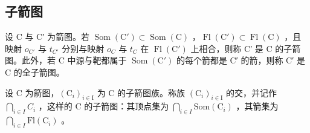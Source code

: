\subsection{子箭图}

设 C 与 C′ 为箭图。若 \(\operatorname{Som}(\mathrm{C}') \subset \operatorname{Som}(\mathrm{C})\) ，\(\operatorname{Fl}(\mathrm{C}') \subset \operatorname{Fl}(\mathrm{C})\) ，且映射 \(o_{C'}\) 与 \(t_{C'}\) 分别与映射 \(o_{C}\) 与 \(t_{C}\) 在 \(\operatorname{Fl}(\mathrm{C}')\) 上相合，则称 C′ 是 C 的子箭图。此外，若 C 中源与靶都属于 \(\operatorname{Som}(\mathrm{C}')\) 的每个箭都是 C′ 的箭，则称 C′ 是 C 的全子箭图。

设 C 为箭图，\((\mathrm{C}_{i})_{i\in\mathrm{I}}\) 为 C 的子箭图族。称族 \((\mathrm{C}_{i})_{i\in\mathrm{I}}\) 的交，并记作 \(\bigcap_{i\in I}C_{i}\) ，这样的 C 的子箭图：其顶点集为 \(\bigcap_{i\in I}\mathrm{Som}(\mathrm{C}_{i})\) ，其箭集为 \(\bigcap_{i\in I}\mathrm{Fl}(\mathrm{C}_{i})\) 。

